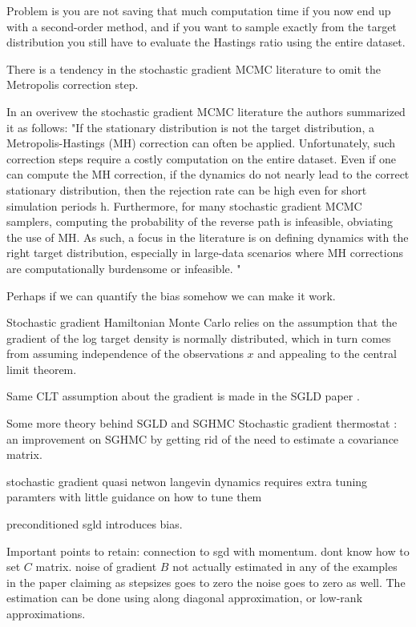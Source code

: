 \documentclass[]{report}
\begin{document}
\cite{chen2014stochastic}

Problem is you are not saving that much computation time if you now end up with a second-order method, and if you want to sample exactly from the target distribution you still have to evaluate the Hastings ratio using the entire dataset.

There is a tendency in the stochastic gradient MCMC literature to omit the Metropolis correction step.

In an overivew the stochastic gradient MCMC literature 
the authors summarized it as follows:
 "If the stationary distribution is not the target distribution, a Metropolis-Hastings (MH) correction can often be applied. Unfortunately, such correction steps require a costly computation on the entire
dataset. Even if one can compute the MH correction, if the dynamics do not nearly lead to the correct stationary distribution, then the rejection rate can be high even for short simulation periods h. Furthermore, for many stochastic gradient MCMC samplers, computing the probability of the reverse path is infeasible, obviating the use of MH. As such, a focus in the literature is on defining dynamics with the right target distribution, especially in large-data scenarios where MH corrections are computationally burdensome or infeasible.
"\cite{ma2015complete}

\cite{ding2014bayesian} 


Perhaps if we can quantify the bias somehow we can make it work.


Stochastic gradient Hamiltonian Monte Carlo \cite{chen2014stochastic}
relies on the assumption that the gradient of the log target density is normally distributed, which in turn comes from assuming independence of the observations $x$ and appealing to the central limit theorem.

Same CLT assumption about the gradient is made in
the SGLD paper \cite{welling2011bayesian}.

Some more theory behind SGLD and SGHMC \cite{ma2015complete}
Stochastic gradient thermostat : an improvement on SGHMC by getting rid of the need to estimate a covariance matrix. 




stochastic gradient quasi netwon langevin dynamics requires extra tuning paramters with little guidance on how to tune them \cite{csimcsekli2016stochastic}

preconditioned sgld introduces bias\cite{li2015preconditioned}.


Important points to retain: connection to sgd with momentum. dont know how to
set $C$ matrix. noise of gradient $B$ not actually estimated in any of the
examples in the paper claiming as stepsizes goes to zero the noise goes to zero
as well. The estimation can be done using along diagonal approximation, or  
low-rank approximations. 
\end{document}
